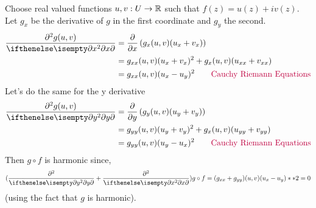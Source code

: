 \documentclass{homework}
\begin{document}
                                                      \begin{solution}
                                                      Choose real valued functions $u, v:U \to \mathbb{R}$ such that $f(z) = u(z) + iv(z)$. Let $g_x$ be the derivative of $g$ in the first coordinate and $g_y$ the second.
                                                      \begin{align*}
                                                      \ppfrac{g(u, v)}{x} &= \pfrac{}{x}\left( g_x(u, v)(u_x + v_x) \right)\\
                                                      &=  g_{xx}(u, v)(u_x + v_x)^2 + g_x(u, v)(u_{xx} + v_{xx})\\
                                                      &=  g_{xx}(u, v)(u_x - u_y)^2 \color{purple} \qquad \text{Cauchy Riemann Equations}
                                                      \end{align*}
                                                      Let's do the same for the y derivative
                                                      \begin{align*}
                                                      \ppfrac{g(u, v)}{y} &= \pfrac{}{y}\left( g_y(u, v)(u_y + v_y) \right)\\
                                                      &=  g_{yy}(u, v)(u_y + v_y)^2 + g_x(u, v)(u_{yy} + v_{yy})\\
                                                      &=  g_{yy}(u, v)(u_y - u_x)^2 \color{purple} \qquad \text{Cauchy Riemann Equations}
                                                      \end{align*}
                                                      Then $g\circ f$ is harmonic since,
                                                      \begin{align*}
                                                          (\ppfrac{}{y}+\ppfrac{}{x})g\circ f = (g_{xx} + g_{yy})(u, v)(u_x - u_y)**2 = 0
                                                          \end{align*}
                                                          (using the fact that $g$ is harmonic).
                                                          \end{solution}
\end{document}

